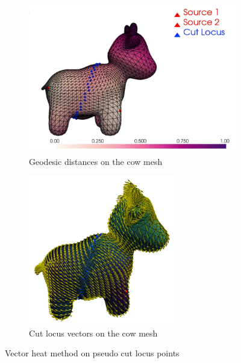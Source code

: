 \documentclass[sigconf]{acmart}
\begin{document}
\begin{figure}[htbp]
  \centering
  \hfill
  \begin{subfigure}[b]{0.23\textwidth}
    \centering
    \includegraphics[width=\textwidth]{img/cut_only_distances_pink.png}
    \caption{Geodesic distances on the cow mesh}
    \label{fig:cut_locus_only_distances}
  \end{subfigure}
  \begin{subfigure}[b]{0.23\textwidth}
    \centering
    \includegraphics[width=0.7\textwidth]{img/cow_cut_locus_vectors.png}
    \caption{Cut locus vectors on the cow mesh}
    \label{fig:cut_locus_cow_vectors}
  \end{subfigure}
  \caption{Vector heat method on pseudo cut locus points}
  \label{fig:cut_locus_vectors}
\end{figure}
\end{document}
